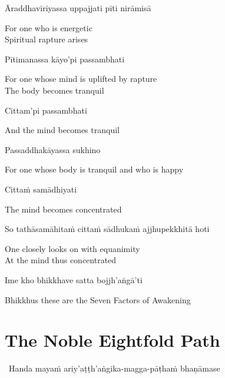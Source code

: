 Āraddhavīriyassa uppajjati pīti nirāmisā

\begin{english}
  For one who is energetic\\
  Spiritual rapture arises
\end{english}

Pītimanassa kāyo'pi passambhati

\begin{english}
  For one whose mind is uplifted by rapture\\
  The body becomes tranquil
\end{english}

Cittam'pi passambhati

\begin{english}
  And the mind becomes tranquil
\end{english}

Passaddhakāyassa sukhino

\begin{english}
  For one whose body is tranquil and who is happy
\end{english}

Cittaṁ samādhiyati

\begin{english}
  The mind becomes concentrated
\end{english}

So tathāsamāhitaṁ cittaṁ sādhukaṁ ajjhupekkhitā hoti

\begin{english}
  One closely looks on with equanimity\\
  At the mind thus concentrated
\end{english}

\suttaRef{[SN 46.3]}

Ime kho bhikkhave satta bojjh'aṅgā'ti

\begin{english}
  Bhikkhus these are the Seven Factors of Awakening
\end{english}

\suttaRef{[SN 46.22]}


\section{The Noble Eightfold Path}
\label{noble-eightfold-path}

\begin{leader}
  \anglebracketleft\ \hspace{-0.5mm}Handa mayaṁ ariy'aṭṭh'aṅgika-magga-pāṭhaṁ bhaṇāmase \hspace{-0.5mm}\anglebracketright\
\end{leader}

